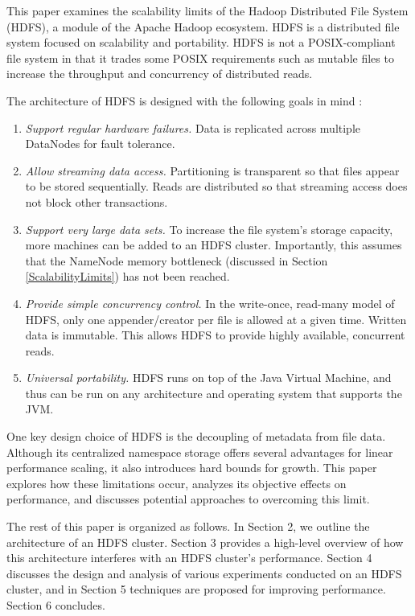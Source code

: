 \documentclass[11pt, a4paper]{article}
\begin{document}
\begin{multicols*}{2}
This paper examines the scalability limits of the Hadoop Distributed File System (HDFS), a module of the Apache Hadoop ecosystem. HDFS is a distributed file system focused on scalability and portability. HDFS is not a POSIX-compliant file system in that it trades some POSIX requirements such as mutable files to increase the throughput and concurrency of distributed reads.

The architecture of HDFS is designed with the following goals in mind \cite{HdfsGuide}:
\begin{enumerate}[leftmargin=0cm,itemindent=.5cm,labelwidth=\itemindent,labelsep=0cm,align=left,label=\arabic*.]
	\item\textit{Support regular hardware failures.} Data is replicated across multiple DataNodes for fault tolerance.
	\item\textit{Allow streaming data access.} Partitioning is transparent so that files appear to be stored sequentially. Reads are distributed so that streaming access does not block other transactions.
	\item\textit{Support very large data sets.} To increase the file system's storage capacity, more machines can be added to an HDFS cluster. Importantly, this assumes that the NameNode memory bottleneck (discussed in Section \ref{ScalabilityLimits}) has not been reached.
	\item\textit{Provide simple concurrency control.} In the write-once, read-many model of HDFS, only one appender/creator per file is allowed at a given time. Written data is immutable. This allows HDFS to provide highly available, concurrent reads.
	\item\textit{Universal portability.} HDFS runs on top of the Java Virtual Machine, and thus can be run on any architecture and operating system that supports the JVM.
\end{enumerate}

One key design choice of HDFS is the decoupling of metadata from file data. Although its centralized namespace storage offers several advantages for linear performance scaling, it also introduces hard bounds for growth. This paper explores how these limitations occur, analyzes its objective effects on performance, and discusses potential approaches to overcoming this limit.

The rest of this paper is organized as follows. In Section 2, we outline the architecture of an HDFS cluster. Section 3 provides a high-level overview of how this architecture interferes with an HDFS cluster's performance. Section 4 discusses the design and analysis of various experiments conducted on an HDFS cluster, and in Section 5 techniques are proposed for improving performance. Section 6 concludes.


\end{multicols*}
\end{document}
